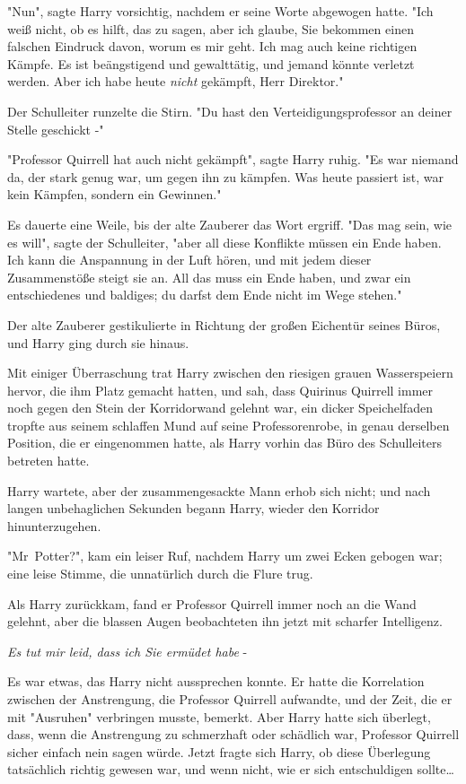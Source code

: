 {"Nun", sagte Harry vorsichtig, nachdem er seine Worte abgewogen hatte. "Ich weiß nicht, ob es hilft, das zu sagen, aber ich glaube, Sie bekommen einen falschen Eindruck davon, worum es mir geht. Ich mag auch keine richtigen Kämpfe. Es ist beängstigend und gewalttätig, und jemand könnte verletzt werden. Aber ich habe heute \emph{nicht} gekämpft, Herr Direktor."

Der Schulleiter runzelte die Stirn. "Du hast den Verteidigungsprofessor an deiner Stelle geschickt -"

"Professor Quirrell hat auch nicht gekämpft", sagte Harry ruhig. "Es war niemand da, der stark genug war, um gegen ihn zu kämpfen. Was heute passiert ist, war kein Kämpfen, sondern ein Gewinnen."

Es dauerte eine Weile, bis der alte Zauberer das Wort ergriff. "Das mag sein, wie es will", sagte der Schulleiter, "aber all diese Konflikte müssen ein Ende haben. Ich kann die Anspannung in der Luft hören, und mit jedem dieser Zusammenstöße steigt sie an. All das muss ein Ende haben, und zwar ein entschiedenes und baldiges; du darfst dem Ende nicht im Wege stehen."

Der alte Zauberer gestikulierte in Richtung der großen Eichentür seines Büros, und Harry ging durch sie hinaus.

Mit einiger Überraschung trat Harry zwischen den riesigen grauen Wasserspeiern hervor, die ihm Platz gemacht hatten, und sah, dass Quirinus Quirrell immer noch gegen den Stein der Korridorwand gelehnt war, ein dicker Speichelfaden tropfte aus seinem schlaffen Mund auf seine Professorenrobe, in genau derselben Position, die er eingenommen hatte, als Harry vorhin das Büro des Schulleiters betreten hatte.

Harry wartete, aber der zusammengesackte Mann erhob sich nicht; und nach langen unbehaglichen Sekunden begann Harry, wieder den Korridor hinunterzugehen.

"Mr~Potter?", kam ein leiser Ruf, nachdem Harry um zwei Ecken gebogen war; eine leise Stimme, die unnatürlich durch die Flure trug.

Als Harry zurückkam, fand er Professor Quirrell immer noch an die Wand gelehnt, aber die blassen Augen beobachteten ihn jetzt mit scharfer Intelligenz.

\emph{Es tut mir leid, dass ich Sie ermüdet habe} -

Es war etwas, das Harry nicht aussprechen konnte. Er hatte die Korrelation zwischen der Anstrengung, die Professor Quirrell aufwandte, und der Zeit, die er mit "Ausruhen" verbringen musste, bemerkt. Aber Harry hatte sich überlegt, dass, wenn die Anstrengung zu schmerzhaft oder schädlich war, Professor Quirrell sicher einfach nein sagen würde. Jetzt fragte sich Harry, ob diese Überlegung tatsächlich richtig gewesen war, und wenn nicht, wie er sich entschuldigen sollte…

}
